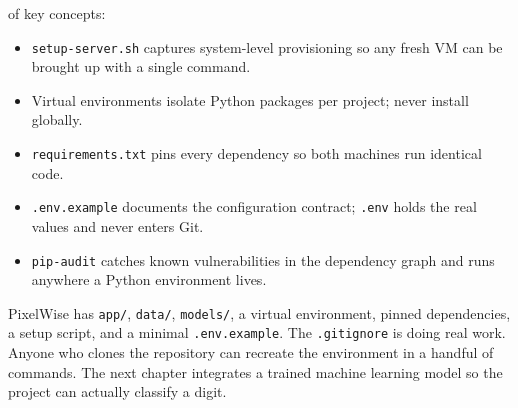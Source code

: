  of key concepts:
\begin{itemize}
    \item \texttt{setup-server.sh} captures system-level provisioning so any fresh VM can be brought up with a single command.
    \item Virtual environments isolate Python packages per project; never install globally.
    \item \texttt{requirements.txt} pins every dependency so both machines run identical code.
    \item \texttt{.env.example} documents the configuration contract; \texttt{.env} holds the real values and never enters Git.
    \item \texttt{pip-audit} catches known vulnerabilities in the dependency graph and runs anywhere a Python environment lives.
\end{itemize}



 PixelWise has \texttt{app/}, \texttt{data/},
\texttt{models/}, a virtual environment, pinned dependencies, a setup script,
and a minimal \texttt{.env.example}.
The \texttt{.gitignore} is doing real work.
Anyone who clones the repository can recreate the environment in a handful
of commands.
The next chapter integrates a trained machine learning model so the project
can actually classify a digit.

